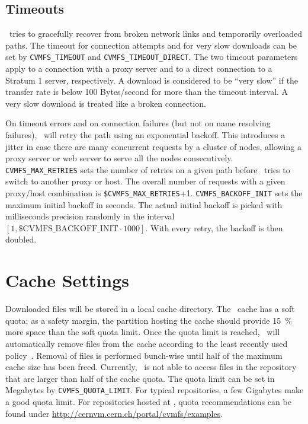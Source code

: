 \subsection{Timeouts}
\cvmfs\ tries to gracefully recover from broken network links and temporarily overloaded paths.
The timeout for connection attempts and for very slow downloads can be set by \texttt{CVMFS\_TIMEOUT} and \texttt{CVMFS\_TIMEOUT\_DIRECT}.
The two timeout parameters apply to a connection with a proxy server and to a direct connection to a Stratum 1 server, respectively.
A download is considered to be ``very slow'' if the transfer rate is below 100 Bytes/second for more than the timeout interval.
A very slow download is treated like a broken connection.

On timeout errors and on connection failures (but not on name resolving failures), \cvmfs\ will retry the path using an exponential backoff.
This introduces a jitter in case there are many concurrent requests by a cluster of nodes, allowing a proxy server or web server to serve all the nodes consecutively.
\texttt{CVMFS\_MAX\_RETRIES} sets the number of retries on a given path before \cvmfs\ tries to switch to another proxy or host. 
The overall number of requests with a given proxy/host combination is \texttt{\$CVMFS\_MAX\_RETRIES}+1.
\texttt{CVMFS\_BACKOFF\_INIT} sets the maximum initial backoff in seconds.  
The actual initial backoff is picked with milliseconds precision randomly in the interval $[1, \text{\$CVMFS\_BACKOFF\_INIT}\cdot 1000]$.
With every retry, the backoff is then doubled.

\section{Cache Settings}
\label{sct:config:cache}
Downloaded files will be stored in a local cache directory.
The \cvmfs\ cache has a soft quota; as a safety margin, the partition hosting the cache should provide \SI{15}{\percent} more space than the soft quota limit.
Once the quota limit is reached, \cvmfs\ will automatically remove files from the cache according to the least recently used policy~\cite{lru06}.
Removal of files is performed bunch-wise until half of the maximum cache size has been freed.
Currently, \cvmfs\ is not able to access files in the repository that are larger than half of the cache quota.
The quota limit can be set in Megabytes by \texttt{CVMFS\_QUOTA\_LIMIT}.
For typical repositories, a few Gigabytes make a good quota limit.
For repositories hosted at \cern, quota recommendations can be found under \url{http://cernvm.cern.ch/portal/cvmfs/examples}.

